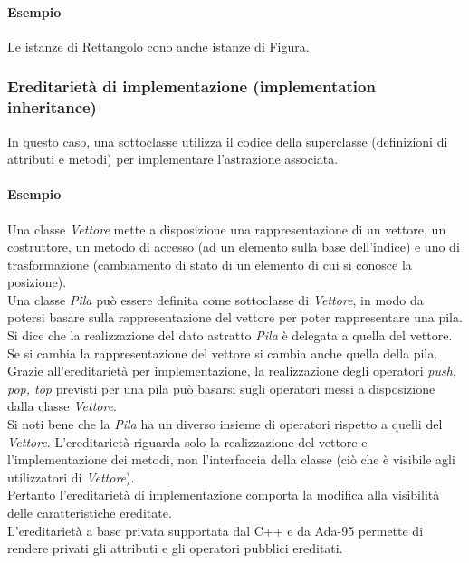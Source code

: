 \documentclass{article}
\begin{document}
	\paragraph*{Esempio} Le istanze di Rettangolo cono anche istanze di Figura.

	\subsubsection{Ereditarietà di implementazione (implementation inheritance)}
	In questo caso, una sottoclasse utilizza il codice della superclasse (definizioni di attributi e metodi) per implementare l'astrazione associata.
	\paragraph*{Esempio} Una classe \textit{Vettore} mette a disposizione una rappresentazione di un vettore, un costruttore, un metodo di accesso (ad un elemento sulla base dell'indice) e uno di trasformazione (cambiamento di stato di un elemento di cui si conosce la posizione).
	\vspace{\baselineskip} \\
	Una classe \textit{Pila} può essere definita come sottoclasse di \textit{Vettore}, in modo da potersi basare sulla rappresentazione del vettore per poter rappresentare una pila. Si dice che la realizzazione del dato astratto \textit{Pila} è delegata a quella del vettore. Se si cambia la rappresentazione del vettore si cambia anche quella della pila.
	\vspace{\baselineskip} \\
	Grazie all'ereditarietà per implementazione, la realizzazione degli operatori \textit{push, pop, top} previsti per una pila può basarsi sugli operatori messi a disposizione dalla classe \textit{Vettore}. \\
	Si noti bene che la \textit{Pila} ha un diverso insieme di operatori rispetto a quelli del \textit{Vettore}. L'ereditarietà riguarda solo la realizzazione del vettore e l'implementazione dei metodi, non l'interfaccia della classe (ciò che è visibile agli utilizzatori di \textit{Vettore}).
	\vspace{\baselineskip} \\
	Pertanto l'ereditarietà di implementazione comporta la modifica alla visibilità delle caratteristiche ereditate.
	\vspace{\baselineskip} \\
	L'ereditarietà a base privata supportata dal C++ e da Ada-95 permette di rendere privati gli attributi e gli operatori pubblici ereditati. \\
\end{document}
